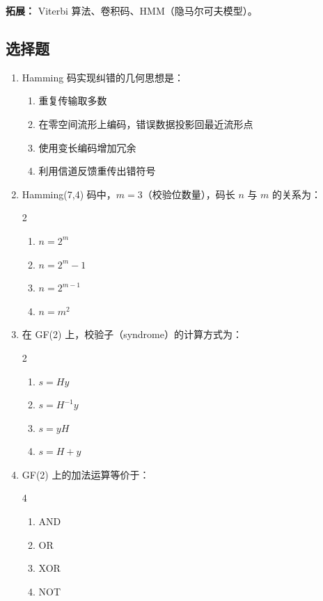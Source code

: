 \documentclass[12pt,a4paper]{ctexart}
\begin{document}
\begin{noteskipped}
\textbf{拓展：} Viterbi 算法、卷积码、HMM（隐马尔可夫模型）。
\end{noteskipped}

\subsection*{选择题}

\begin{enumerate}[label=\arabic*., leftmargin=*]

\item Hamming 码实现纠错的几何思想是：
\begin{enumerate}[label=(\Alph*)]
  \item 重复传输取多数
  \item 在零空间流形上编码，错误数据投影回最近流形点
  \item 使用变长编码增加冗余
  \item 利用信道反馈重传出错符号
\end{enumerate}

\item Hamming(7,4) 码中，$m=3$（校验位数量），码长 $n$ 与 $m$ 的关系为：
\begin{multicols}{2}
\begin{enumerate}[label=(\Alph*)]
  \item $n = 2^m$
  \item $n = 2^m - 1$
  \item $n = 2^{m-1}$
  \item $n = m^2$
\end{enumerate}
\end{multicols}

\item 在 GF(2) 上，校验子（syndrome）的计算方式为：
\begin{multicols}{2}
\begin{enumerate}[label=(\Alph*)]
  \item $s = H y$
  \item $s = H^{-1} y$
  \item $s = y H$
  \item $s = H + y$
\end{enumerate}
\end{multicols}

\item GF(2) 上的加法运算等价于：
\begin{multicols}{4}
\begin{enumerate}[label=(\Alph*)]
  \item AND
  \item OR
  \item XOR
  \item NOT
\end{enumerate}
\end{multicols}


\end{enumerate}
\end{document}
